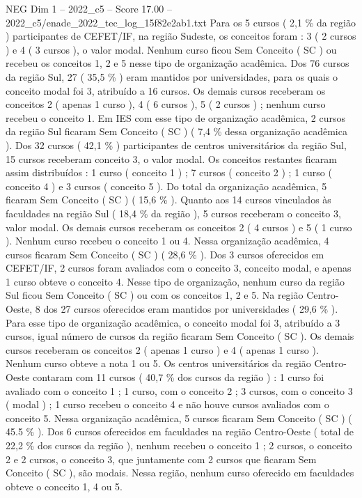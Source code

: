 \begin{textsample}{NEG Dim 1 – 2022\_c5 – Score 17.00 – 2022\_c5/enade\_2022\_tec\_log\_15f82e2ab1.txt}
Para os 5 cursos ( 2,1 \% da região ) participantes de CEFET/IF, na região Sudeste, os conceitos foram : 3 ( 2 cursos ) e 4 ( 3 cursos ), o valor modal.
Nenhum curso ficou Sem Conceito ( SC ) ou recebeu os conceitos 1, 2 e 5 nesse tipo de organização acadêmica.
Dos 76 cursos da região Sul, 27 ( 35,5 \% ) eram mantidos por universidades, para os quais o conceito modal foi 3, atribuído a 16 cursos.
Os demais cursos receberam os conceitos 2 ( apenas 1 curso ), 4 ( 6 cursos ), 5 ( 2 cursos ) ; nenhum curso recebeu o conceito 1.
Em IES com esse tipo de organização acadêmica, 2 cursos da região Sul ficaram Sem Conceito ( SC ) ( 7,4 \% dessa organização acadêmica ).
Dos 32 cursos ( 42,1 \% ) participantes de centros universitários da região Sul, 15 cursos receberam conceito 3, o valor modal.
Os conceitos restantes ficaram assim distribuídos : 1 curso ( conceito 1 ) ; 7 cursos ( conceito 2 ) ; 1 curso ( conceito 4 ) e 3 cursos ( conceito 5 ).
Do total da organização acadêmica, 5 ficaram Sem Conceito ( SC ) ( 15,6 \% ).
Quanto aos 14 cursos vinculados às faculdades na região Sul ( 18,4 \% da região ), 5 cursos receberam o conceito 3, valor modal.
Os demais cursos receberam os conceitos 2 ( 4 cursos ) e 5 ( 1 curso ).
Nenhum curso recebeu o conceito 1 ou 4.
Nessa organização acadêmica, 4 cursos ficaram Sem Conceito ( SC ) ( 28,6 \% ).
Dos 3 cursos oferecidos em CEFET/IF, 2 cursos foram avaliados com o conceito 3, conceito modal, e apenas 1 curso obteve o conceito 4.
Nesse tipo de organização, nenhum curso da região Sul ficou Sem Conceito ( SC ) ou com os conceitos 1, 2 e 5.
Na região Centro-Oeste, 8 dos 27 cursos oferecidos eram mantidos por universidades ( 29,6 \% ).
Para esse tipo de organização acadêmica, o conceito modal foi 3, atribuído a 3 cursos, igual número de cursos da região ficaram Sem Conceito ( SC ).
Os demais cursos receberam os conceitos 2 ( apenas 1 curso ) e 4 ( apenas 1 curso ).
Nenhum curso obteve a nota 1 ou 5.
Os centros universitários da região Centro-Oeste contaram com 11 cursos ( 40,7 \% dos cursos da região ) : 1 curso foi avaliado com o conceito 1 ; 1 curso, com o conceito 2 ; 3 cursos, com o conceito 3 ( modal ) ; 1 curso recebeu o conceito 4 e não houve cursos avaliados com o conceito 5.
Nessa organização acadêmica, 5 cursos ficaram Sem Conceito ( SC ) ( 45.5 \% ).
Dos 6 cursos oferecidos em faculdades na região Centro-Oeste ( total de 22,2 \% dos cursos da região ), nenhum recebeu o conceito 1 ; 2 cursos, o conceito 2 e 2 cursos, o conceito 3, que juntamente com 2 cursos que ficaram Sem Conceito ( SC ), são modais.
Nessa região, nenhum curso oferecido em faculdades obteve o conceito 1, 4 ou 5.

\end{textsample}

